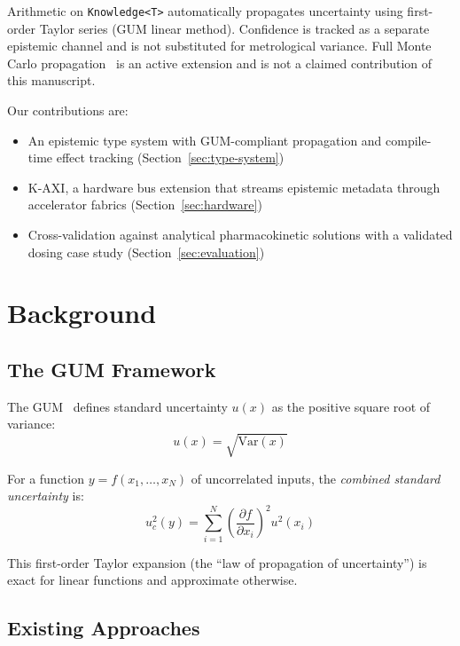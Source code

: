 \documentclass[journal]{IEEEtran}
\begin{document}
Arithmetic on \texttt{Knowledge<T>} automatically propagates uncertainty
using first-order Taylor series (GUM linear method). Confidence is tracked
as a separate epistemic channel and is not substituted for metrological
variance. Full Monte Carlo propagation~\cite{jcgm2008supplement1} is an
active extension and is not a claimed contribution of this manuscript.

Our contributions are:
\begin{itemize}
  \item An epistemic type system with GUM-compliant propagation and
        compile-time effect tracking (Section~\ref{sec:type-system})
  \item K-AXI, a hardware bus extension that streams epistemic metadata
        through accelerator fabrics (Section~\ref{sec:hardware})
  \item Cross-validation against analytical pharmacokinetic solutions
        with a validated dosing case study (Section~\ref{sec:evaluation})
\end{itemize}

\section{Background}
\label{sec:background}

\subsection{The GUM Framework}

The GUM~\cite{jcgm2008gum} defines standard uncertainty $u(x)$ as the
positive square root of variance:
\[
u(x) = \sqrt{\text{Var}(x)}
\]

For a function $y = f(x_1, \ldots, x_N)$ of uncorrelated inputs, the
\emph{combined standard uncertainty} is:
\begin{equation}
  u_c^2(y) = \sum_{i=1}^{N} \left(\frac{\partial f}{\partial x_i}\right)^2 u^2(x_i)
  \label{eq:gum-propagation}
\end{equation}

This first-order Taylor expansion (the ``law of propagation of
uncertainty'') is exact for linear functions and approximate otherwise.

\subsection{Existing Approaches}
\end{document}
